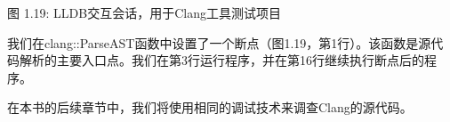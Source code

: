 \begin{center}
图 1.19: LLDB交互会话，用于Clang工具测试项目
\end{center}


我们在clang::ParseAST函数中设置了一个断点（图1.19，第1行）。该函数是源代码解析的主要入口点。我们在第3行运行程序，并在第16行继续执行断点后的程序。

在本书的后续章节中，我们将使用相同的调试技术来调查Clang的源代码。






